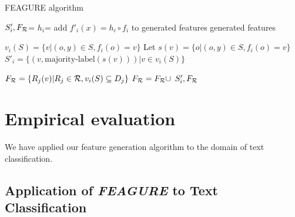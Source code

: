 \documentclass[letterpaper]{article} %
\theoremstyle{definition}
\begin{document}
\begin{algorithm}[H]
	\caption{FEAGURE algorithm}
	\label{code-creating-prob}
	\small
	\begin{algorithmic}
		\State $S'_i,F_{\cal R}$=  %
		\State $h_i$=  
		\State add $f'_i(x)=h_i\circ f_i$ to generated features
		\EndFor
		\State \Return generated features
		\EndFunction

		\State $v_i(S) = \{v | (o,y) \in S, f_{i}(o)=v\}$
		\State Let $s(v)=\{o | (o,y)\in S, f_{i}(o)=v\}$
		\State 	$S'_i = \{ (v, \mbox{majority-label}(s(v))) | v \in v_i(S)\}$
		
		
		\State $F_{\cal R}=\{R_j(v)| R_j\in{\cal R}, v_i(S)\subseteq D_j\}$
		 \State $F_{\cal R}=F_{\cal R}\cup$
		\EndIf
		\State \Return $S'_i, F_{\cal R}$ 
		\EndFunction
		
	\end{algorithmic}
\end{algorithm}


\section{Empirical evaluation}
We have applied our feature generation algorithm to the domain of text classification.

\subsection{Application of \emph{FEAGURE} to Text Classification} \label{text-feagure}

\end{document}
